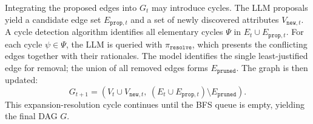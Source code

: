 Integrating the proposed edges into $G_t$ may introduce cycles. The LLM proposals yield a candidate edge set $E_{\mathtt{prop},t}$ and a set of newly discovered attributes $V_{\mathtt{new},t}$. A cycle detection algorithm identifies all elementary cycles $\Psi$ in $E_t \cup E_{\mathtt{prop},t}$. For each cycle $\psi \in \Psi$, the LLM is queried with $\pi_{\mathtt{resolve}}$, which presents the conflicting edges together with their rationales. The model identifies the single least-justified edge for removal; the union of all removed edges forms $E_{\mathtt{pruned}}$. The graph is then updated:
\begin{equation}
    G_{t+1} = (V_t \cup V_{\mathtt{new}, t},\ (E_t \cup E_{\mathtt{prop}, t}) \setminus E_{\mathtt{pruned}}).
\end{equation}
This expansion-resolution cycle continues until the BFS queue is empty, yielding the final DAG $G$.

